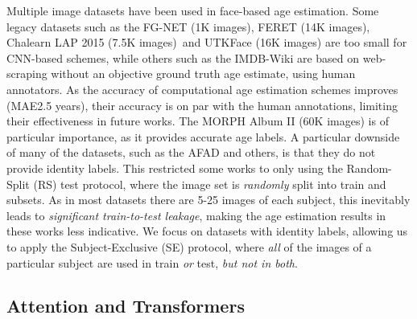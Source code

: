 \documentclass[10pt,journal]{IEEEtran}\usepackage{amsfonts}
\begin{document}
Multiple image datasets have been used in face-based age estimation. Some
legacy datasets such as the FG-NET \cite{cootes2008fg} (1K images), FERET
\cite{PHILLIPS1998295} (14K images), Chalearn LAP 2015
\cite{agustsson2017appareal} (7.5K images)\ and UTKFace \cite{zhifei2017cvpr}
(16K images) are too small for CNN-based schemes, while others such as the
IMDB-Wiki \cite{7406390} are based on web-scraping without an objective ground
truth age estimate, using human annotators. As the accuracy of computational
age estimation schemes improves (MAE2.5 years), their accuracy is on
par with the human annotations, limiting their effectiveness in future works.
The MORPH Album II \cite{1613043} (60K images) is of particular importance, as
it provides accurate age labels. A particular downside of many of the
datasets, such as the AFAD \cite{7780901} and others, is that they do not
provide identity labels. This restricted some works to only using the
Random-Split (RS) test protocol, where the image set is \textit{randomly}
split into train and subsets. As in most datasets there are 5-25 images of
each subject, this inevitably leads to \textit{significant train-to-test
leakage}, making the age estimation results in these works less indicative. We
focus on datasets with identity labels, allowing us to apply the
Subject-Exclusive (SE) protocol, where \textit{all} of the images of a
particular subject are used in train \textit{or} test, \textit{but not in
both}.

\subsection{Attention and Transformers}
\end{document}

